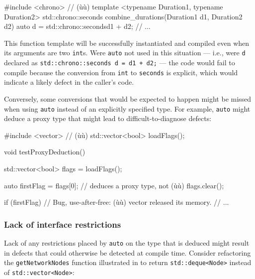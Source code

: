 \begin{emcppslisting}
#include <chrono>  // (ù{}ù)
template <typename Duration1, typename Duration2>
std::chrono::seconds combine_durations(Duration1 d1, Duration2 d2)
{
    auto d = std::chrono::seconds{d1 + d2};
    // ...
}
\end{emcppslisting}
    
\noindent This function template will be successfully instantiated and compiled
even when its arguments are two \lstinline!int!s. Were \lstinline!auto! not
used in this situation --- i.e., were \lstinline!d! declared as
\lstinline!std::chrono::seconds!~\lstinline!d!~\lstinline!=!~\lstinline!d1!~\lstinline!+!~\lstinline!d2;!
--- the code would fail to compile because the conversion from
\lstinline!int! to \lstinline!seconds! is explicit, which would indicate a
likely defect in the caller's code.

Conversely, some conversions that would be expected to happen might be
missed when using \lstinline!auto! instead of an explicitly specified type.
For example, \lstinline!auto! might deduce a proxy type that might lead to
difficult-to-diagnose defects:

\begin{emcppshiddenlisting}[emcppsbatch=e17]
#include <vector>     // (ù{}ù)
std::vector<bool> loadFlags();
\end{emcppshiddenlisting}
\begin{emcppslisting}[emcppsbatch=e17]
void testProxyDeduction()
{
    std::vector<bool> flags = loadFlags();

    auto firstFlag = flags[0];  // deduces a proxy type, not (ù{}ù)
    flags.clear();

    if (firstFlag) // Bug, use-after-free: (ù{}ù) vector released its memory.
    {
        // ...
    }
}
\end{emcppslisting}
    

\subsubsection[Lack of interface restrictions]{Lack of interface restrictions}\label{lack-of-interface-restrictions}

Lack of any restrictions placed by \lstinline!auto! on the type that is
deduced might result in defects that could otherwise be detected at
compile time. Consider refactoring the \lstinline!getNetworkNodes! function
illustrated in  to return \lstinline!std::deque<Node>! instead of
\lstinline!std::vector<Node>!:

